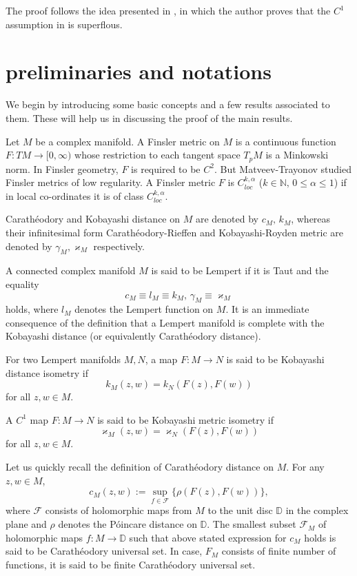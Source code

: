 \documentclass[12pt]{amsart}
\numberwithin{equation}{section}
\theoremstyle{remark}
\begin{document}
The proof follows the idea presented in \cite{Edigarian}, in which the author proves that 
the $C^1$ assumption in \cite[~Theorem 1]{cha-zwo1} is superflous.
 
 

	\section{preliminaries and notations}

We begin by introducing some basic concepts and a few results associated to them. 
These will help us in discussing the proof of the main 
results.

Let $M$ be a complex manifold. A Finsler metric on $M$ is a continuous function 
$F:TM\to [0,\infty)$ whose restriction to each tangent space $T_pM$ is a Minkowski norm.
In Finsler geometry, $F$ is required to be $C^2$. But Matveev-Trayonov studied Finsler 
metrics of low regularity. A Finsler metric $F$ is $C^{k,\alpha}_{loc}$ ($k\in \mathbb{N},
\, 0\leq \alpha\leq 1$) if in local co-ordinates it is of class $C^{k,\alpha}_{loc}.$

Carath\'{e}odory and Kobayashi distance on $M$ are denoted by $c_M,\, k_M$, whereas 
their infinitesimal form Carath\'{e}odory-Rieffen and Kobayashi-Royden metric are 
denoted by $\gamma_M, \varkappa_M$ respectively.

A connected complex manifold $M$ is said to be Lempert if it is Taut and the equality
$$c_M\equiv l_M\equiv k_M,\, \gamma_M\equiv \varkappa_M$$ holds, where $l_M$ denotes
the Lempert function on $M.$ It is an immediate consequence of the definition that 
a Lempert manifold is complete with the Kobayashi distance (or equivalently 
Carath\'{e}odory distance).

For two Lempert manifolds $M,N$, a map $F:M\to N$  is said to be Kobayashi distance isometry if 
$$k_M(z,w)=k_{N}(F(z),F(w))$$ for all $z,w\in M.$

A $C^1$ map $F:M\to N$ is said to be Kobayashi metric isometry if 
$$\varkappa_M(z,w)=\varkappa_N(F(z),F(w))$$ for all $z,w\in M$. 

Let us quickly recall the definition of Carath\'{e}odory distance on $M$. For any 
$z,w\in M$, $$c_M(z,w):=\sup_{f\in \mathcal{F}}\{\rho(F(z),F(w))\},$$ 
where $\mathcal{F}$ consists of holomorphic maps from $M$ to the unit disc $\mathbb{D}$
in the complex plane and $\rho$ denotes the P\'{o}incare distance on $\mathbb{D}$. 
The smallest subset $\mathcal{F}_M$ of holomorphic maps $f:M\to \mathbb{D}$ such that 
above stated expression for $c_M$ holds is said to be Carath\'{e}odory universal set. 
In case, $F_M$ consists of finite number of functions, it is said to be finite 
Carath\'{e}odory universal set.
\end{document}
